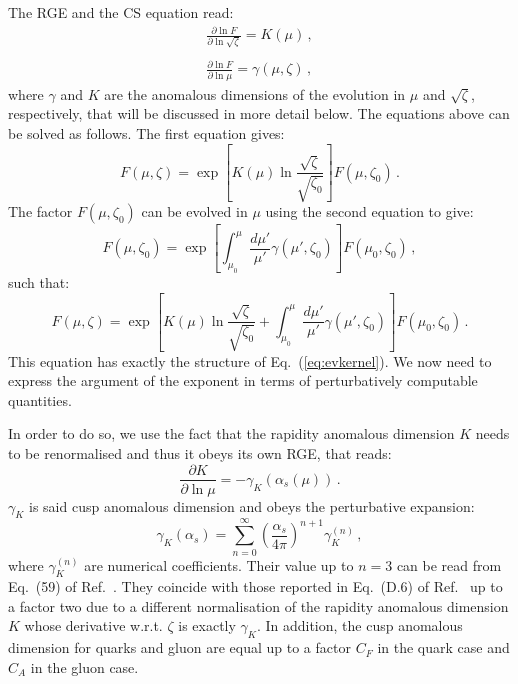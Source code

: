 \documentclass[10pt,a4paper]{article}
\begin{document}
The RGE and the CS equation read:
\begin{equation}\label{eq:eveqs}
\begin{array}{l}
\displaystyle \frac{\partial \ln F}{\partial \ln \sqrt{\zeta}} =
  K(\mu)\,,\\
\\
\displaystyle \frac{\partial \ln F}{\partial \ln \mu} = \gamma(\mu,\zeta)\,,
\end{array}
\end{equation}
where $\gamma$ and $K$ are the anomalous dimensions of the evolution
in $\mu$ and $\sqrt{\zeta}$, respectively, that will be discussed in
more detail below. The equations above can be solved as follows. The
first equation gives:
\begin{equation}\label{eq:zetadir}
F(\mu,\zeta) = \exp\left[  K(\mu)\ln\frac{\sqrt{\zeta}}{\sqrt{\zeta_0}}\right]F(\mu,\zeta_0)\,.
\end{equation}
The factor $F(\mu,\zeta_0)$ can be evolved in $\mu$ using the second
equation to give:
\begin{equation}\label{eq:mudir}
F(\mu,\zeta_0) = \exp\left[ \int_{\mu_0}^{\mu}\frac{d\mu'}{\mu'}\gamma(\mu',\zeta_0)\right]F(\mu_0,\zeta_0)\,,
\end{equation}
such that:
\begin{equation}\label{eq:solution1}
  F(\mu,\zeta) = \exp\left[ K(\mu)\ln\frac{\sqrt{\zeta}}{\sqrt{\zeta_0}}+\int_{\mu_0}^{\mu}\frac{d\mu'}{\mu'}\gamma(\mu',\zeta_0)\right]F(\mu_0,\zeta_0)\,.
\end{equation}
This equation has exactly the structure of Eq.~(\ref{eq:evkernel}). We
now need to express the argument of the exponent in terms of
perturbatively computable quantities.

In order to do so, we use the fact that the rapidity anomalous
dimension $K$ needs to be renormalised and thus it obeys its own RGE,
that reads:
\begin{equation}\label{eq:CuspRGE}
\frac{\partial K}{\partial \ln \mu} = - \gamma_K(\alpha_s(\mu))\,.
\end{equation}
$\gamma_K$ is said cusp anomalous dimension and obeys the perturbative
expansion:
\begin{equation}
\gamma_K(\alpha_s) = \sum_{n=0}^{\infty}\left(\frac{\alpha_s}{4\pi}\right)^{n+1}\gamma_K^{(n)}\,,
\end{equation}
where $\gamma_K^{(n)}$ are numerical coefficients. Their value up to
$n=3$ can be read from Eq.~(59) of Ref.~\cite{Collins:2017oxh}. They
coincide with those reported in Eq.~(D.6) of
Ref.~\cite{Echevarria:2016scs} up to a factor two due to a different
normalisation of the rapidity anomalous dimension $K$ whose derivative
w.r.t. $\zeta$ is exactly $\gamma_K$. In addition, the cusp anomalous
dimension for quarks and gluon are equal up to a factor $C_F$ in the
quark case and $C_A$ in the gluon case.
\end{document}
